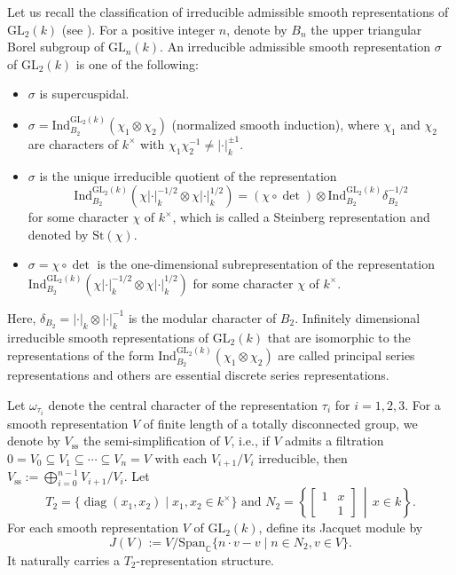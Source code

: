 \documentclass[12pt]{amsart}
\newcommand{\GL}{{\mathrm{GL}}}
\newcommand{\Ind}{{\mathrm{Ind}}}
\newcommand{\Span}{{\mathrm{Span}}}
\newcommand{\diag}{\operatorname{diag}}
\newcommand{\absk}[1]{\left\lvert#1\right\rvert_k}
\theoremstyle{Theorem}
\theoremstyle{Theorem}
\theoremstyle{Theorem}
\theoremstyle{Theorem}
\theoremstyle{Plain}
\theoremstyle{remark}
\theoremstyle{remark}
\theoremstyle{Definition}
\begin{document}
Let us recall the classification of irreducible admissible smooth representations of $ \mathrm{GL}_2(k) $ (see \cite[9.11]{B-H}). For a positive integer $n$, denote by $B_n$ the upper triangular Borel subgroup of $\GL_n(k)$.  An irreducible admissible smooth representation $\sigma$ of $\GL_2(k)$ is one of the following:
\begin{itemize}
    \item $\sigma$ is supercuspidal.
    \item $ \sigma = \Ind^{ \GL_2(k) }_{B_2}( \chi_1 \otimes \chi_2 ) $ (normalized smooth induction), where $\chi_1$ and $\chi_2$ are characters of $k^\times$ with $ \chi_1 \chi_2^{-1} \ne \absk{ \cdot }^{ \pm1 }$.
    \item $\sigma$ is the unique irreducible quotient of the representation
    \[
        \Ind^{ \GL_2(k) }_{B_2} \left( \chi \absk{ \cdot }^{-1/2} \otimes \chi \absk{ \cdot }^{1/2} \right) = ( \chi \circ \det ) \otimes \Ind^{ \GL_2(k) }_{B_2} \delta_{B_2}^{-1/2}
    \]
    for some character $\chi$ of $k^\times$, which is called a Steinberg representation and denoted by $ \mathrm{St}( \chi ) $.
    \item $ \sigma = \chi \circ \det $ is the one-dimensional subrepresentation of the representation $ \Ind^{ \GL_2(k) }_{B_2} \left( \chi \absk{ \cdot }^{-1/2} \otimes \chi \absk{ \cdot }^{1/2} \right) $ for some character $\chi$ of $k^\times$.
\end{itemize}
Here, $ \delta_{B_2} = \absk{ \cdot } \otimes \absk{ \cdot }^{-1} $ is the modular character of $B_2$. Infinitely dimensional irreducible smooth representations of $\GL_2(k)$ that are isomorphic to the representations of the form $ \Ind^{ \GL_2(k) }_{B_2}( \chi_1 \otimes \chi_2 ) $ are called principal series representations and others are essential discrete series representations.   

Let $ \omega_{ \tau_i } $ denote the central character of the representation $\tau_i$ for $ i = 1, 2, 3 $. For a smooth representation $V$ of finite length of a totally disconnected group, we denote by $ V_\mathrm{ss} $ the semi-simplification of $V$, i.e., if $V$ admits a filtration $ 0 = V_0 \subseteq V_1 \subseteq \cdots \subseteq V_n = V $ with each $ V_{i + 1} / V_i $ irreducible, then $ V_\mathrm{ss} := \bigoplus_{i = 0}^{n - 1} V_{i + 1} / V_i $. Let 
\[ 
    T_2 = \{ \diag( x_1, x_2 ) \mid x_1, x_2 \in k^\times \} \text{ and } N_2 = \left\{
    \begin{bmatrix}
        1 & x\\
          & 1
    \end{bmatrix}
    \, \middle| \, x \in k \right\}. 
\]
For each smooth representation $V$ of $\GL_2(k)$, define its Jacquet module by 
\[
    J(V) := V / \Span_{ \mathbb{C} } \{ n \cdot v - v \mid n \in N_2, v \in V \}.
\]
It naturally carries a $T_2$-representation structure. 
\end{document}
